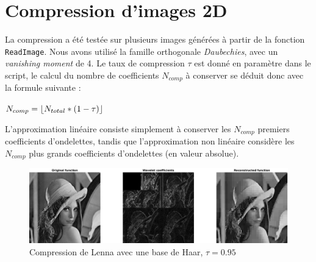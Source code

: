\documentclass[a4paper,12pt, openany, twoside]{article}
\DeclarePairedDelimiter\floor{\lfloor}{\rfloor}
\theoremstyle{break}
\begin{document}



\pagestyle{fancy}


\clearpage

\section{Compression d'images 2D}
La compression a été testée sur plusieurs images générées à partir de la fonction \texttt{ReadImage}. Nous avons utilisé la famille orthogonale \textit{Daubechies}, avec un \textit{vanishing moment} de 4. Le taux de compression $\tau$ est donné en paramètre dans le script, le calcul du nombre de coefficients $N_{comp}$ à conserver se déduit donc avec la formule suivante :

  $N_{comp} = \floor* {N_{total} * (1 - \tau)}$

L'approximation linéaire consiste simplement à conserver les $N_{comp}$ premiers coefficients d'ondelettes, tandis que l'approximation non linéaire considère les $N_{comp}$ plus grands coefficients d'ondelettes (en valeur absolue).




\begin{figure}[H]
  \centering
  \includegraphics[width=\textwidth]{comp_LennaHaar95.png}\vfill
  \caption{Compression de Lenna avec une base de Haar, $\tau=0.95$}
\end{figure}
\end{document}
